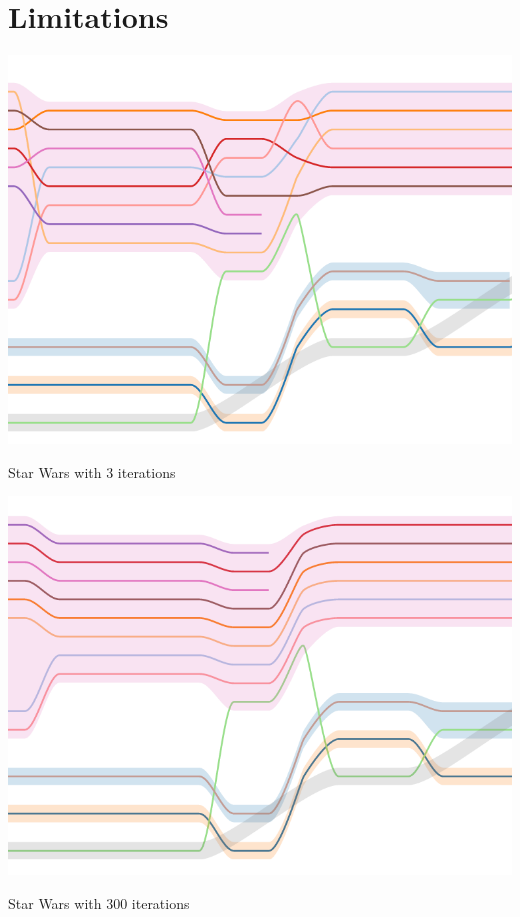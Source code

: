 \documentclass{report}
\begin{document}
\section{Limitations}
\centerline{\includegraphics[width=\textwidth]{iterations_3}}
\par
\begin{center}
Star Wars with 3 iterations
\end{center}
\centerline{\includegraphics[width=\textwidth]{iterations_300}}
\par
\begin{center}
Star Wars with 300 iterations
\end{center}
\end{document}
